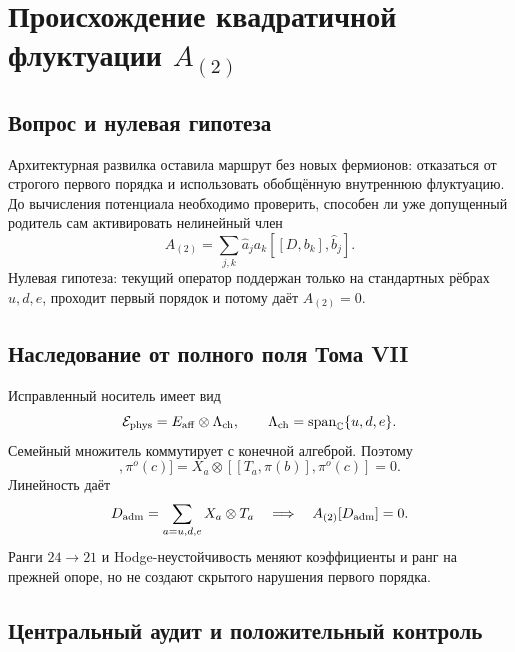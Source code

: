 \chapter{Происхождение квадратичной флуктуации \texorpdfstring{$A_{(2)}$}{A(2)}}
\label{ch:v7-r2-generalized-fluctuation-seed-origin-gate}

\section{Вопрос и нулевая гипотеза}

Архитектурная развилка оставила маршрут без новых фермионов: отказаться от
строгого первого порядка и использовать обобщённую внутреннюю флуктуацию.
До вычисления потенциала необходимо проверить, способен ли уже допущенный
родитель сам активировать нелинейный член
\begin{equation}
 A_{(2)}=\sum_{j,k}\widehat a_j a_k[[D,b_k],\widehat b_j].
 \label{eq:v7-a2-seed-source}
\end{equation}
Нулевая гипотеза: текущий оператор поддержан только на стандартных рёбрах
$u,d,e$, проходит первый порядок и потому даёт $A_{(2)}=0$.

\section{Наследование от полного поля Тома VII}

Исправленный носитель имеет вид
\begin{equation}
 \mathcal E_{\rm phys}=E_{\rm aff}\otimes\Lambda_{\rm ch},
 \qquad \Lambda_{\rm ch}=\operatorname{span}_{\mathbb C}\{u,d,e\}.
 \label{eq:v7-a2-admitted-carrier}
\end{equation}
Семейный множитель коммутирует с конечной алгеброй. Поэтому
\begin{equation}
 [[X_a\otimes T_a,\pi(b)],\pi^o(c)]
 =X_a\otimes[[T_a,\pi(b)],\pi^o(c)]=0.
 \label{eq:v7-a2-family-factorization}
\end{equation}
Линейность даёт
\begin{equation}
 D_{\rm adm}=\sum_{a=u,d,e}X_a\otimes T_a
 \quad\Longrightarrow\quad A_{(2)}[D_{\rm adm}]=0.
 \label{eq:v7-a2-admitted-zero}
\end{equation}
Ранги $24\to21$ и Hodge-неустойчивость меняют коэффициенты и ранг на
прежней опоре, но не создают скрытого нарушения первого порядка.

\section{Центральный аудит и положительный контроль}

